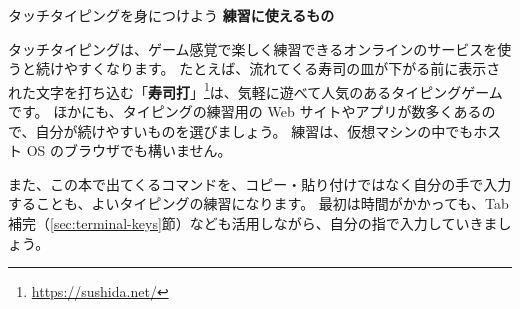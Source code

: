 \begin{tips}{タッチタイピングを身につけよう}
  \textbf{練習に使えるもの}

  タッチタイピングは、ゲーム感覚で楽しく練習できるオンラインのサービスを使うと続けやすくなります。
  たとえば、流れてくる寿司の皿が下がる前に表示された文字を打ち込む「\textbf{寿司打}」\footnote{\url{https://sushida.net/}}は、気軽に遊べて人気のあるタイピングゲームです。
  ほかにも、タイピングの練習用の Web サイトやアプリが数多くあるので、自分が続けやすいものを選びましょう。
  練習は、仮想マシンの中でもホスト OS のブラウザでも構いません。

  また、この本で出てくるコマンドを、コピー・貼り付けではなく自分の手で入力することも、よいタイピングの練習になります。
  最初は時間がかかっても、Tab 補完（\ref{sec:terminal-keys}節）なども活用しながら、自分の指で入力していきましょう。
\end{tips}
